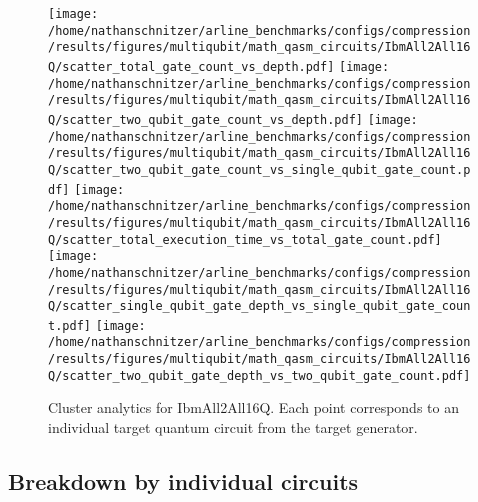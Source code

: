 \documentclass{report}%
\begin{document}
\begin{figure}[h!]%
\centering%
\texttt{[image: /home/nathanschnitzer/arline\_benchmarks/configs/compression/results/figures/multiqubit/math\_qasm\_circuits/IbmAll2All16Q/scatter\_total\_gate\_count\_vs\_depth.pdf]}%
\centering%
\texttt{[image: /home/nathanschnitzer/arline\_benchmarks/configs/compression/results/figures/multiqubit/math\_qasm\_circuits/IbmAll2All16Q/scatter\_two\_qubit\_gate\_count\_vs\_depth.pdf]}%
\linebreak%
\centering%
\texttt{[image: /home/nathanschnitzer/arline\_benchmarks/configs/compression/results/figures/multiqubit/math\_qasm\_circuits/IbmAll2All16Q/scatter\_two\_qubit\_gate\_count\_vs\_single\_qubit\_gate\_count.pdf]}%
\centering%
\texttt{[image: /home/nathanschnitzer/arline\_benchmarks/configs/compression/results/figures/multiqubit/math\_qasm\_circuits/IbmAll2All16Q/scatter\_total\_execution\_time\_vs\_total\_gate\_count.pdf]}%
\linebreak%
\centering%
\texttt{[image: /home/nathanschnitzer/arline\_benchmarks/configs/compression/results/figures/multiqubit/math\_qasm\_circuits/IbmAll2All16Q/scatter\_single\_qubit\_gate\_depth\_vs\_single\_qubit\_gate\_count.pdf]}%
\centering%
\texttt{[image: /home/nathanschnitzer/arline\_benchmarks/configs/compression/results/figures/multiqubit/math\_qasm\_circuits/IbmAll2All16Q/scatter\_two\_qubit\_gate\_depth\_vs\_two\_qubit\_gate\_count.pdf]}%
\linebreak%
\caption{Cluster analytics for IbmAll2All16Q. Each point corresponds to an individual target
                    quantum circuit from the target generator.}%
\end{figure}

%
\clearpage%
\subsection*{Breakdown by individual circuits }%
\label{subsec:Breakdownbyindividualcircuits}%

%
\end{document}
